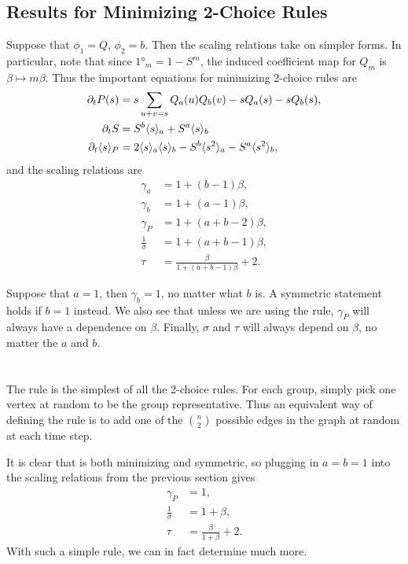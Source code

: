 \documentclass[twoside,10pt]{article}
\begin{document}
\subsection{Results for Minimizing 2-Choice Rules}

Suppose that $\phi_1 = Q$, $\phi_2 = b$. Then the scaling relations take on simpler forms. In particular, note that since $\ang{1}_{m} = 1 - S^{m}$, the induced coefficient map for $Q_m$ is $\beta \mapsto m \beta$. Thus the important equations for minimizing 2-choice rules are
\begin{align*}
        \partial_{t}{P(s)} &= s \sum_{u+v=s} Q_a(u) Q_b(v) - s Q_a(s) - s Q_b(s),\\
        \partial_{t}{S} &= S^{b}\langle s \rangle_{a} + S^{a}\langle s \rangle_{b}\\        \partial_{t}{\langle s \rangle_{P}} &= 2 \langle s \rangle_{a}\langle s \rangle_{b} - S^{b}\langle s^{2} \rangle_{a} - S^{a}\langle s^{2} \rangle_{b},
\end{align*}
and the scaling relations are
\begin{align*}
        \gamma_{a} &= 1 + (b-1)\beta,\\
        \gamma_{b} &= 1+(a-1)\beta,\\
        \gamma_{P} &= 1+(a+b-2)\beta,\\
        \frac{1}{\sigma} &= 1+(a+b-1)\beta,\\
        \tau &= \frac{\beta}{1+(a+b-1)\beta} +2.
\end{align*}

Suppose that $a=1$, then $\gamma_b=1$, no matter what $b$ is. A symmetric statement holds if $b=1$ instead. We also see that unless we are using the \ER rule, $\gamma_{P}$ will always have a dependence on $\beta$. Finally, $\sigma$ and $\tau$ will always depend on $\beta$, no matter the $a$ and $b$.

\section{\ER}

The \ER rule is the simplest of all the 2-choice rules. For each group, simply pick one vertex at random to be the group representative. Thus an equivalent way of defining the \ER rule is to add one of the $\binom{n}{2}$ possible edges in the graph at random at each time step.

It is clear that \ER is both minimizing and symmetric, so plugging in $a=b=1$ into the scaling relations from the previous section gives
\begin{align*}
	\gamma_{P} &= 1,\\
	\frac{1}{\sigma} &= 1 + \beta,\\
	\tau &= \frac{\beta}{1+\beta} +2.
\end{align*}
With such a simple rule, we can in fact determine much more.
\end{document}

